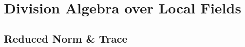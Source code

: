 \chapter{Division Algebra over Local Fields}\label{cha:div_over_local}

\section{Reduced Norm \& Trace}
    
